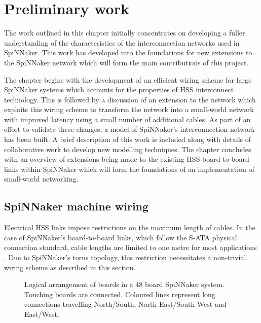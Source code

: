 \chapter{Preliminary work}
	\label{sec:preliminary-work}
	
	
	The work outlined in this chapter initially concentrates on developing a
	fuller understanding of the characteristics of the interconnection networks
	used in SpiNNaker. This work has developed into the foundations for new
	extensions to the SpiNNaker network which will form the main contributions of
	this project.
	
	The chapter begins with the development of an efficient wiring scheme for
	large SpiNNaker systems which accounts for the properties of HSS interconnect
	technology. This is followed by a discussion of an extension to the network
	which exploits this wiring scheme to transform the network into a small-world
	network with improved latency using a small number of additional cables.  As
	part of an effort to validate these changes, a model of SpiNNaker's
	interconnection network has been built. A brief description of this work is
	included along with details of collaborative work to develop new modelling
	techniques.  The chapter concludes with an overview of extensions being made
	to the existing HSS board-to-board links within SpiNNaker which will form the
	foundations of an implementation of small-world networking.
	
	\section{SpiNNaker machine wiring}
		
		
		Electrical HSS links impose restrictions on the maximum length of cables. In
		the case of SpiNNaker's board-to-board links, which follow the S-ATA
		physical connection standard, cable lengths are limited to one metre for
		most applications \cite{sata3spec}. Due to SpiNNaker's torus topology, this
		restriction necessitates a non-trivial wiring scheme as described in this
		section.
		
		\begin{figure}
			\center
			
			\caption[Logical arrangement of boards in a 48 board SpiNNaker
			system.]{Logical arrangement of boards in a 48 board SpiNNaker system.
			Touching boards are connected. Coloured lines represent long connections
			travelling {\color{red}North/South},
			{\color{green}North-East/South-West} and {\color{blue}East/West}.}
			\label{fig:boardsLogical}
		\end{figure}
		
